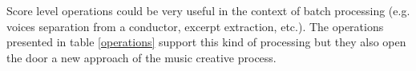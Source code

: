 \documentclass[twoside,10pt,a4paper]{article}
\begin{document}
Score level operations could be very useful in the context of batch processing (e.g. voices separation from a conductor, excerpt extraction, etc.). The operations presented in table \ref{operations} support this kind of processing but they also open the door a new approach of the music creative process. 



\end{document}
